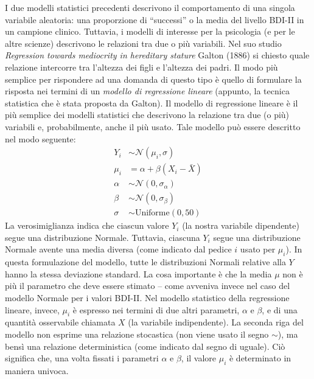 I due modelli statistici precedenti descrivono il comportamento di una singola variabile aleatoria: una proporzione di \enquote{successi} o la media del livello BDI-II in un campione clinico.
Tuttavia, i modelli di interesse per la psicologia (e per le altre scienze) descrivono le relazioni tra due o più variabili.
Nel suo studio \emph{Regression towards mediocrity in hereditary stature}  Galton (1886) si chiesto quale relazione intercorre tra l'altezza dei figli e l'altezza dei padri.
Il modo più semplice per rispondere ad una domanda di questo tipo è quello di formulare la risposta nei termini di un \emph{modello di regressione lineare} (appunto, la tecnica statistica che è stata proposta da Galton). 
Il modello di regressione lineare è il più semplice dei modelli statistici che descrivono la relazione tra due (o più) variabili e, probabilmente, anche il più usato.
Tale modello può essere descritto nel modo seguente:
\begin{align}
Y_i &\sim \mathcal{N}(\mu_i, \sigma) \tag*{[verosimiglianza]}\\
\mu_i &= \alpha + \beta(X_i - \bar{X}) \tag*{[modello lineare]}\\
\alpha &\sim \mathcal{N}(0, \sigma_{\alpha}) \tag*{[distr. a priori per $\alpha$]}\\
\beta &\sim \mathcal{N}(0, \sigma_{\beta}) \tag*{[distr. a priori per $\beta$]}\\
\sigma &\sim \text{Uniforme}(0, 50) \tag*{[distr. a priori per $\sigma$]}
\end{align}
La verosimiglianza indica che ciascun valore $Y_i$ (la nostra variabile dipendente) segue una distribuzione Normale.
Tuttavia, ciascuna $Y_i$ segue una distribuzione Normale avente una media diversa (come indicato dal pedice $i$ usato per $\mu_i$).
In questa formulazione del modello, tutte le distribuzioni Normali relative alla $Y$ hanno la stessa deviazione standard.
La cosa importante è che la media $\mu$ non è più il parametro che deve essere stimato -- come avveniva invece nel caso del modello Normale per i valori BDI-II.
Nel modello statistico della regressione lineare, invece, $\mu_i$ è espresso nei termini di due altri parametri, $\alpha$ e $\beta$, e di una quantità osservabile chiamata $X$ (la variabile indipendente).
La seconda riga del modello non esprime una relazione stocastica (non viene usato il segno $\sim$), ma bensì una relazione deterministica (come indicato dal segno di uguale). 
Ciò significa che, una volta fissati i parametri $\alpha$ e $\beta$, il valore $\mu_i$ è determinato in maniera univoca.

